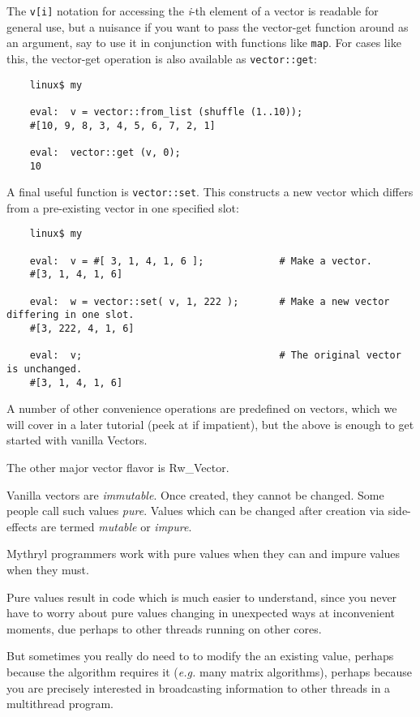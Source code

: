 The {\tt v[i]} notation for accessing the {\it i}-th element of a vector 
is readable for general use, but a nuisance if you want to pass the 
vector-get function around as an argument, say to use it in conjunction with 
functions like {\tt map}.  For cases like this, the vector-get operation 
is also available as {\tt vector::get}:

\begin{verbatim}
    linux$ my

    eval:  v = vector::from_list (shuffle (1..10));
    #[10, 9, 8, 3, 4, 5, 6, 7, 2, 1]

    eval:  vector::get (v, 0);
    10
\end{verbatim}

A final useful function is {\tt vector::set}.  This constructs a new 
vector which differs from a pre-existing vector in one specified slot:

\begin{verbatim}
    linux$ my

    eval:  v = #[ 3, 1, 4, 1, 6 ];             # Make a vector.
    #[3, 1, 4, 1, 6]

    eval:  w = vector::set( v, 1, 222 );       # Make a new vector differing in one slot.
    #[3, 222, 4, 1, 6]

    eval:  v;                                  # The original vector is unchanged.
    #[3, 1, 4, 1, 6]
\end{verbatim}


A number of other convenience operations are predefined on vectors, 
which we will cover in a later tutorial (peek at  
if impatient), but 
the above is enough to get started with vanilla Vectors.

The other major vector flavor is Rw\_Vector.

Vanilla vectors are {\it immutable}.  Once created, they cannot be changed. 
Some people call such values {\it pure}.  Values which can be changed after 
creation via side-effects are termed {\it mutable} or {\it impure}.

Mythryl programmers work with pure values when they can and impure values 
when they must.

Pure values result in code which is much easier to understand, since 
you never have to worry about pure values changing in unexpected ways 
at inconvenient moments, due perhaps to other threads running on other 
cores.

But sometimes you really do need to to modify the an existing value, 
perhaps because the algorithm requires it ({\it e.g.} many matrix algorithms), 
perhaps because you are precisely interested in broadcasting information 
to other threads in a multithread program.

